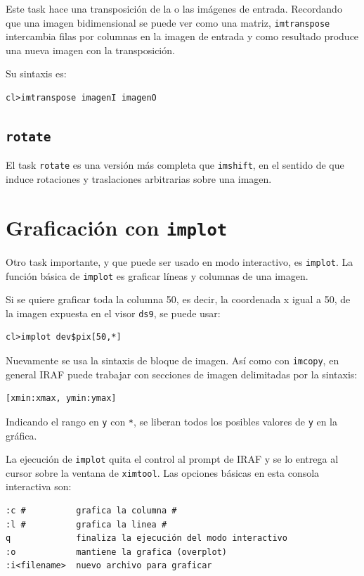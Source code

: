 Este task hace una transposición de la o las imágenes de entrada. Recordando que una imagen bidimensional se puede ver como una matriz, \texttt{imtranspose} intercambia filas por columnas en la imagen de entrada y como resultado produce una nueva imagen con la transposición.

Su sintaxis es:

\begin{verbatim}
cl>imtranspose imagenI imagenO
\end{verbatim}

\subsection{\texttt{rotate}}

El task \texttt{rotate} es una versión más completa que \texttt{imshift}, en el sentido de que induce rotaciones y traslaciones arbitrarias sobre una imagen.

\section{Graficación con \texttt{implot}}

Otro task importante, y que puede ser usado en modo interactivo, es \texttt{implot}. La función básica de \texttt{implot} es graficar líneas y columnas de una imagen.

Si se quiere graficar toda la columna 50, es decir, la coordenada x igual a 50, de la imagen expuesta en el visor \texttt{ds9}, se puede usar:

\begin{verbatim}
cl>implot dev$pix[50,*]
\end{verbatim}

Nuevamente se usa la sintaxis de bloque de imagen. Así como con \texttt{imcopy}, en general IRAF puede trabajar con secciones de imagen delimitadas por la sintaxis:

\begin{verbatim}
[xmin:xmax, ymin:ymax]
\end{verbatim}

Indicando el rango en \texttt{y} con \texttt{*}, se liberan todos los posibles valores de \texttt{y} en la gráfica.

La ejecución de \texttt{implot} quita el control al prompt de IRAF y se lo entrega al cursor sobre la ventana de \texttt{ximtool}. Las opciones básicas en esta consola interactiva son:

\begin{verbatim}
:c #          grafica la columna #
:l #          grafica la linea #
q             finaliza la ejecución del modo interactivo
:o            mantiene la grafica (overplot)
:i<filename>  nuevo archivo para graficar
\end{verbatim}


